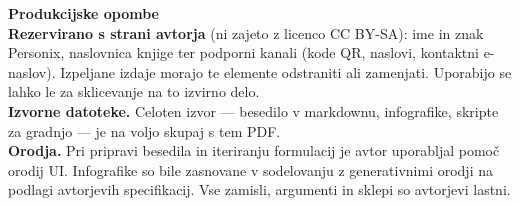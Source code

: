 \clearpage
\thispagestyle{empty}
\begin{flushleft}\small\sffamily
\textbf{Produkcijske opombe}\\[1.2em]

\textbf{Rezervirano s strani avtorja} (ni zajeto z licenco CC BY-SA): ime in
znak Personix, naslovnica knjige ter podporni kanali (kode QR, naslovi,
kontaktni e-naslov). Izpeljane izdaje morajo te elemente odstraniti ali
zamenjati. Uporabijo se lahko le za sklicevanje na to izvirno delo.\\[1.2em]

\textbf{Izvorne datoteke.} Celoten izvor --- besedilo v markdownu, infografike,
skripte za gradnjo --- je na voljo skupaj s tem PDF.\\[1.2em]

\textbf{Orodja.} Pri pripravi besedila in iteriranju formulacij je avtor
uporabljal pomoč orodij UI. Infografike so bile zasnovane v sodelovanju z
generativnimi orodji na podlagi avtorjevih specifikacij. Vse zamisli,
argumenti in sklepi so avtorjevi lastni.
\end{flushleft}
\clearpage
